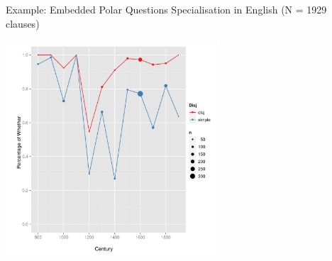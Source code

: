 \documentclass[hyperref={pdfpagelabels=false}]{beamer}
\begin{document}
%
%
% 
%
% 
%
%
\begin{frame}{Example: Embedded Polar Questions} 
Specialisation in English (N = 1929 clauses)

\begin{center}
 
\includegraphics[width=0.6\textwidth]{whetherifEng.pdf}
\end{center}
\end{frame}
\end{document}
